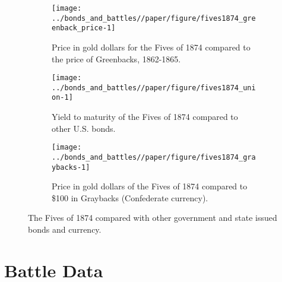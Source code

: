 \begin{figure}[!htpb]
  \begin{subfigure}[t]{0.45\linewidth}
    \texttt{[image: ../bonds\_and\_battles//paper/figure/fives1874\_greenback\_price-1]}
  \caption{Price in gold dollars for the Fives of 1874 compared to the price of Greenbacks, 1862-1865.}
  \label{bonds:fig:fives1874_greenbacks}
\end{subfigure}%
\hspace{0.1\linewidth}%
\begin{subfigure}[t]{0.45\linewidth}
    \texttt{[image: ../bonds\_and\_battles//paper/figure/fives1874\_union-1]}
    \caption{Yield to maturity of the Fives of 1874 compared to other U.S. bonds.}
  \label{bonds:fig:fives1874_union}
\end{subfigure}
\begin{subfigure}[t]{0.45\linewidth}
  \texttt{[image: ../bonds\_and\_battles//paper/figure/fives1874\_graybacks-1]}
  \caption{Price in gold dollars of the Fives of 1874 compared to \$100 in Graybacks (Confederate currency).}
\label{bonds:fig:fives1874_grayback}
\end{subfigure}
\caption{The Fives of 1874 compared with other government and state issued bonds and currency.}
\label{bonds:fig:fives1874_compared}
\end{figure}



\section{Battle Data}
\label{sec:battle-data}

